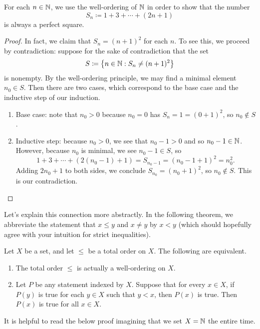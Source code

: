\documentclass[../notes.tex]{subfiles}
\begin{document}
\begin{example} \label{exe:perfect-square-wop}
    For each $n\in\mathbb N$, we use the well-ordering of $\mathbb N$ in order to show that the number
    \[S_n\coloneqq1+3+\cdots+(2n+1)\]
    is always a perfect square.
\end{example}
\begin{proof}
    In fact, we claim that $S_n=(n+1)^2$ for each $n$. To see this, we proceed by contradiction: suppose for the sake of contradiction that the set
    \[S\coloneqq\left\{n\in\mathbb N:S_n\ne(n+1)^2\right\}\]
    is nonempty. By the well-ordering principle, we may find a minimal element $n_0\in S$. Then there are two cases, which correspond to the base case and the inductive step of our induction.
    \begin{enumerate}
        \item Base case: note that $n_0>0$ because $n_0=0$ has $S_n=1=(0+1)^2$, so $n_0\notin S$.
        \item Inductive step: because $n_0>0$, we see that $n_0-1>0$ and so $n_0-1\in\mathbb N$. However, because $n_0$ is minimal, we see $n_0-1\in S$, so
        \[1+3+\cdots+(2(n_0-1)+1)=S_{n_0-1}=(n_0-1+1)^2=n_0^2.\]
        Adding $2n_0+1$ to both sides, we conclude $S_{n_0}=(n_0+1)^2$, so $n_0\notin S$. This is our contradiction.
        \qedhere
    \end{enumerate}
\end{proof}
Let's explain this connection more abstractly. In the following theorem, we abbreviate the statement that $x \leq y$ and $x \neq y$ by $x < y$ (which should hopefully agree with your intuition for strict inequalities).
\begin{theorem} \label{thm:well-order-is-induction}
    Let $X$ be a set, and let $\le$ be a total order on $X$. The following are equivalent.
    \begin{enumerate}[label=(\alph*)]
        \item The total order $\le$ is actually a well-ordering on $X$.
        \item Let $P$ be any statement indexed by $X$. Suppose that for every $x \in X$, if $P(y)$ is true for each $y \in X$ such that $y < x$, then $P(x)$ is true. Then $P(x)$ is true for all $x \in X$.
    \end{enumerate}
\end{theorem}
It is helpful to read the below proof imagining that we set $X=\mathbb N$ the entire time.
\end{document}
